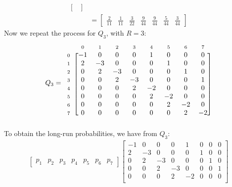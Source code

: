 \documentclass[12pt]{article}
\newcommand{\matindex}[1]{\mbox{\scriptsize#1}}%
\begin{document}
\begin{align*}
\begin{bmatrix}
    \end{bmatrix} \\ 
    &= \begin{bmatrix}
        \displaystyle\frac{2}{11} & \displaystyle\frac{1}{11} & \displaystyle\frac{3}{22} & \displaystyle\frac{9}{44} & \displaystyle\frac{9}{44} & \displaystyle\frac{5}{44} & \displaystyle\frac{3}{44}
    \end{bmatrix}
\end{align*} Now we repeat the process for $Q_{3}$, with $R = 3$: \begin{equation}
    Q_3 = \begin{blockarray}{ccccccccc}
        & \matindex{0} & \matindex{1} & \matindex{2} & \matindex{3} &\matindex{4} &\matindex{5} &\matindex{6}&\matindex{7}\\
        \begin{block}{c[cccccccc]}
            \matindex{0} & -1 & 0 & 0 & 0 & 1 & 0 & 0 & 0\\ 
            \matindex{1} & 2 & -3 & 0 & 0 & 0 & 1 & 0 & 0\\ 
            \matindex{2} & 0 & 2 & -3 & 0 & 0 & 0 & 1 & 0\\ 
            \matindex{3} & 0 & 0 & 2 & -3 & 0 & 0 & 0 & 1 \\ 
            \matindex{4} & 0 & 0 & 0 & 2 & -2 & 0 & 0 & 0 \\ 
            \matindex{5} & 0 & 0 & 0 & 0 & 2 & -2 & 0 & 0 \\ 
            \matindex{6} & 0 & 0 & 0 & 0 & 0 & 2 & -2 & 0 \\ 
            \matindex{7} & 0 & 0 & 0 & 0 & 0 & 0 & 2 & -2 \\ 
        \end{block}
    \end{blockarray}
\end{equation} To obtain the long-run probabilities, we have from $Q_{3}$: \begin{align*}
    \begin{bmatrix}
        p_1 & p_2 & p_3 & p_4 & p_5 & p_6 & p_7
    \end{bmatrix} \begin{bmatrix}
        -1 & 0 & 0 & 0 & 1 & 0 & 0 & 0\\ 
        2 & -3 & 0 & 0 & 0 & 1 & 0 & 0\\ 
        0 & 2 & -3 & 0 & 0 & 0 & 1 & 0\\ 
        0 & 0 & 2 & -3 & 0 & 0 & 0 & 1 \\ 
        0 & 0 & 0 & 2 & -2 & 0 & 0 & 0 \\ 

\end{bmatrix}
\end{align*}
\end{document}
